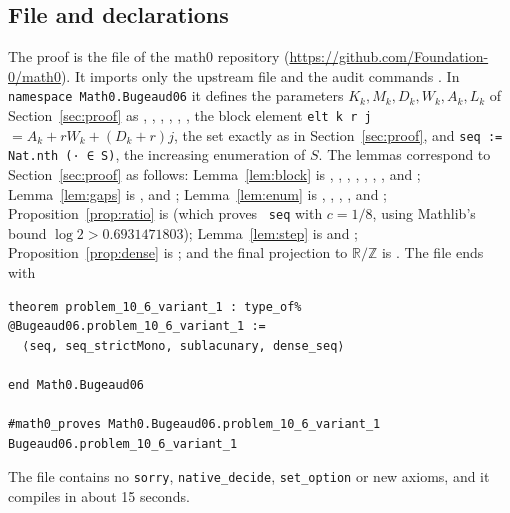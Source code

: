 \documentclass[11pt]{amsart}
\theoremstyle{plain}
\theoremstyle{definition}
\newcommand{\R}{\mathbb{R}}
\newcommand{\Z}{\mathbb{Z}}
\begin{document}
\subsection*{File and declarations}
The proof is the file  of the math0 repository (\url{https://github.com/Foundation-0/math0}). It imports only the upstream file  and the audit commands . In \texttt{namespace Math0.Bugeaud06} it defines the parameters $K_k,M_k,D_k,W_k,A_k,L_k$ of Section~\ref{sec:proof} as , , , , , , the block element \texttt{elt k r j}~$=A_k+rW_k+(D_k+r)j$, the set  exactly as in Section~\ref{sec:proof}, and \texttt{seq := Nat.nth (· ∈ S)}, the increasing enumeration of $S$.
The lemmas correspond to Section~\ref{sec:proof} as follows: Lemma~\ref{lem:block} is , , , , , , ,  and ; Lemma~\ref{lem:gaps} is ,  and ; Lemma~\ref{lem:enum} is , , , ,  and ; Proposition~\ref{prop:ratio} is  (which proves ~\texttt{seq} with $c=1/8$, using Mathlib's bound $\log2>0.6931471803$); Lemma~\ref{lem:step} is  and ; Proposition~\ref{prop:dense} is ; and the final projection to $\R/\Z$ is . The file ends with
\begin{lstlisting}
theorem problem_10_6_variant_1 : type_of% @Bugeaud06.problem_10_6_variant_1 :=
  ⟨seq, seq_strictMono, sublacunary, dense_seq⟩

end Math0.Bugeaud06

#math0_proves Math0.Bugeaud06.problem_10_6_variant_1 Bugeaud06.problem_10_6_variant_1
\end{lstlisting}
The file contains no \texttt{sorry}, \texttt{native\_decide}, \texttt{set\_option} or new axioms, and it compiles in about 15 seconds.
\end{document}

